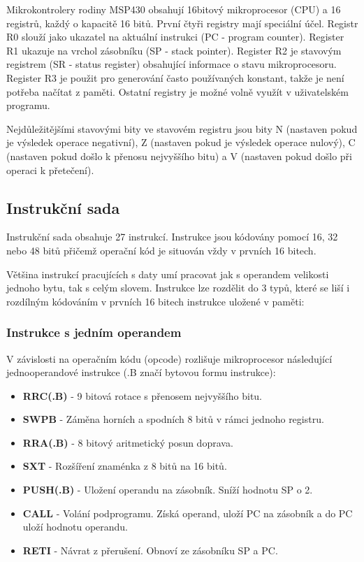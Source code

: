 Mikrokontrolery rodiny MSP430 obsahují 16bitový mikroprocesor (CPU) a 16 registrů, každý o kapacitě 16 bitů. První čtyři registry mají speciální účel. Registr R0 slouží jako ukazatel na aktuální instrukci (PC - program counter). Register R1 ukazuje na vrchol zásobníku (SP - stack pointer). Register R2 je stavovým registrem (SR - status register) obsahující informace o stavu mikroprocesoru. Register R3 je použit pro generování často používaných konstant, takže je není potřeba načítat z paměti. Ostatní registry je možné volně využít v uživatelském programu.

Nejdůležitějšími stavovými bity ve stavovém registru jsou bity N (nastaven pokud je výsledek operace negativní), Z (nastaven pokud je výsledek operace nulový), C (nastaven pokud došlo k přenosu nejvyššího bitu) a V (nastaven pokud došlo při operaci k přetečení).

\subsection{Instrukční sada}

Instrukční sada obsahuje 27 instrukcí. Instrukce jsou kódovány pomocí 16, 32 nebo 48 bitů přičemž operační kód je situován vždy v prvních 16 bitech.

Většina instrukcí pracujících s daty umí pracovat jak s operandem velikosti jednoho bytu, tak s celým slovem. Instrukce lze rozdělit do 3 typů, které se liší i rozdílným kódováním v prvních 16 bitech instrukce uložené v paměti:

\subsubsection{Instrukce s jedním operandem}

V závislosti na operačním kódu (opcode) rozlišuje mikroprocesor následující jednooperandové instrukce (.B značí bytovou formu instrukce):

\begin{itemize}
\item \textbf{RRC(.B)} - 9 bitová rotace s přenosem nejvyššího bitu.
\item \textbf{SWPB} - Záměna horních a spodních 8 bitů v rámci jednoho registru.
\item \textbf{RRA(.B)} - 8 bitový aritmetický posun doprava.
\item \textbf{SXT} - Rozšíření znaménka z 8 bitů na 16 bitů.
\item \textbf{PUSH(.B)} - Uložení operandu na zásobník. Sníží hodnotu SP o 2.
\item \textbf{CALL} - Volání podprogramu. Získá operand, uloží PC na zásobník a do PC uloží hodnotu operandu.
\item \textbf{RETI} - Návrat z přerušení. Obnoví ze zásobníku SP a PC.
\end{itemize}


